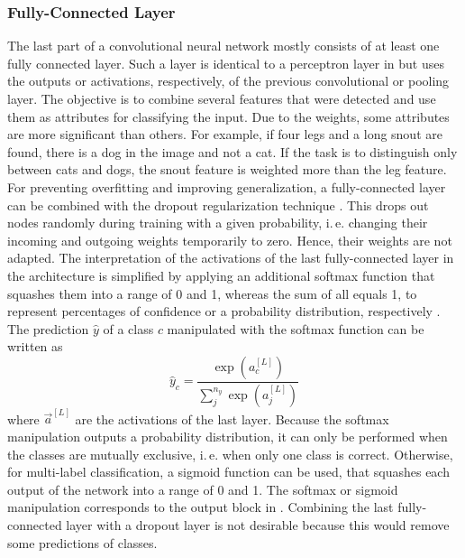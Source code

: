 \subsubsection{Fully-Connected Layer}
\label{sec:cnn-fully-connected}
The last part of a convolutional neural network mostly consists of at least one fully connected layer.
Such a layer is identical to a perceptron layer in  but uses the outputs or activations, respectively, of the previous convolutional or pooling layer.
The objective is to combine several features that were detected and use them as attributes for classifying the input.
Due to the weights, some attributes are more significant than others.
For example, if four legs and a long snout are found, there is a dog in the image and not a cat.
If the task is to distinguish only between cats and dogs, the snout feature is weighted more than the leg feature.
For preventing overfitting and improving generalization, a fully-connected layer can be combined with the dropout regularization technique \cite{Srivastava:2014:DSW:2627435.2670313}.
This drops out nodes randomly during training with a given probability, i.\,e. changing their incoming and outgoing weights temporarily to zero.
Hence, their weights are not adapted.
The interpretation of the activations of the last fully-connected layer in the architecture is simplified by applying an additional softmax function that squashes them into a range of 0 and 1, whereas the sum of all equals 1, to represent percentages of confidence or a probability distribution, respectively \cite{Bishop2006}.
The prediction $\hat{y}$ of a class $c$ manipulated with the softmax function can be written as
\begin{equation}
	\label{eq:softmax}
	\hat{y}_c = \frac{\exp(a^{[L]}_c)}{\sum_{j}^{n_y} \exp(a^{[L]}_j)}
\end{equation}
where $\vec{a}^{[L]}$ are the activations of the last layer.
Because the softmax manipulation outputs a probability distribution, it can only be performed when the classes are mutually exclusive, i.\,e. when only one class is correct.
Otherwise, for multi-label classification, a sigmoid function can be used, that squashes each output of the network into a range of 0 and 1.
The softmax or sigmoid manipulation corresponds to the output block in .
Combining the last fully-connected layer with a dropout layer is not desirable because this would remove some predictions of classes.
